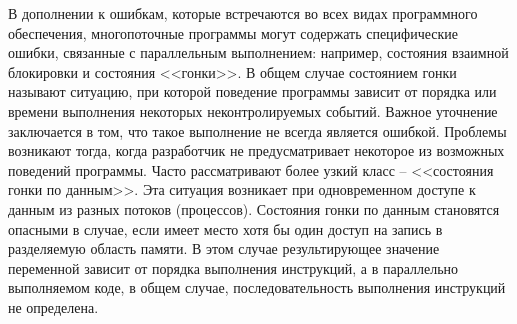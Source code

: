 


В дополнении к ошибкам, которые встречаются во всех видах программного обеспечения, многопоточные программы могут содержать специфические ошибки, связанные с параллельным выполнением: например, состояния взаимной блокировки и состояния <<гонки>>.
В общем случае состоянием гонки называют ситуацию, при которой поведение программы зависит от порядка или времени выполнения некоторых неконтролируемых событий.
Важное уточнение заключается в том, что такое выполнение не всегда является ошибкой.
Проблемы возникают тогда, когда разработчик не предусматривает некоторое из возможных поведений программы.
Часто рассматривают более узкий класс -- <<состояния гонки по данным>>. Эта ситуация возникает при одновременном доступе к данным из разных потоков (процессов).
Состояния гонки по данным становятся опасными в случае, если имеет место хотя бы один доступ на запись в разделяемую область памяти.
В этом случае результирующее значение переменной зависит от порядка выполнения инструкций, а в параллельно выполняемом коде, в общем случае, последовательность выполнения инструкций не определена. 


